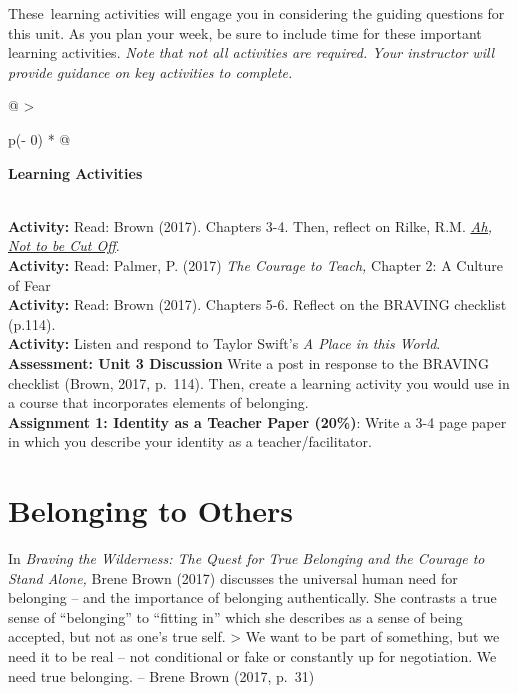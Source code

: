 \documentclass[
]{book}
\begin{document}
These~learning activities will engage you in considering the guiding questions for this unit. As you plan your week, be sure to include time for these important learning activities. \emph{Note that not all activities are required. Your instructor will provide guidance on key activities to complete.}

\begin{longtable}[]{@{}
  >{\raggedright\arraybackslash}p{(\columnwidth - 0\tabcolsep) * }@{}}
\toprule
\begin{minipage}[b]{\linewidth}\raggedright
\textbf{Learning Activities}
\end{minipage} \\
\midrule
\endhead
\textbf{Activity:} Read: Brown (2017). Chapters 3-4. Then, reflect on Rilke, R.M. \emph{\href{https://gladdestthing.com/poems/ah-not-to-be-cut-off}{Ah, Not to be Cut Off}}. \\
\textbf{Activity:} Read: Palmer, P. (2017) \emph{The Courage to Teach,} Chapter 2: A Culture of Fear \\
\textbf{Activity:} Read: Brown (2017). Chapters 5-6. Reflect on the BRAVING checklist (p.114). \\
\textbf{Activity:} Listen and respond to Taylor Swift's \emph{A Place in this World}. \\
\textbf{Assessment: Unit 3 Discussion} Write a post in response to the BRAVING checklist (Brown, 2017, p.~114). Then, create a learning activity you would use in a course that incorporates elements of belonging. \\
\textbf{Assignment 1: Identity as a Teacher Paper (20\%)}: Write a 3-4 page paper in which you describe your identity as a teacher/facilitator. \\
\bottomrule
\end{longtable}

\hypertarget{belonging-to-others-1}{%
\section{Belonging to Others}\label{belonging-to-others-1}}

In \emph{Braving the Wilderness: The Quest for True Belonging and the Courage to Stand Alone,} Brene Brown (2017) discusses the universal human need for belonging -- and the importance of belonging authentically. She contrasts a true sense of ``belonging'' to ``fitting in'' which she describes as a sense of being accepted, but not as one's true self.
\textgreater{} We want to be part of something, but we need it to be real -- not conditional or fake or constantly up for negotiation. We need true belonging. -- Brene Brown (2017, p.~31)
\end{document}
